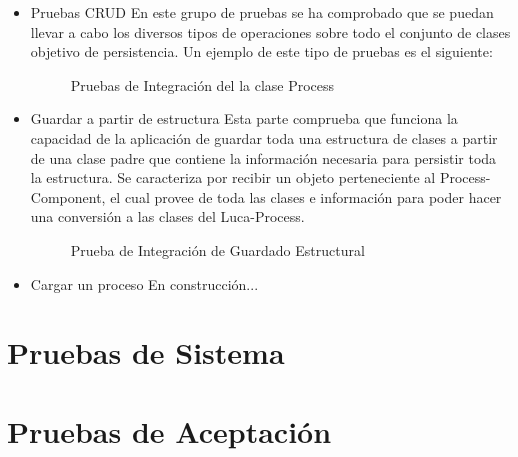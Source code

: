 		\begin{itemize}
			\item Pruebas CRUD
			\subitem En este grupo de pruebas se ha comprobado que se puedan llevar a cabo los diversos tipos de operaciones sobre todo el conjunto de clases objetivo de persistencia. Un ejemplo de este tipo de pruebas es el siguiente: 
			
			\begin{figure}[H]
				\centering
				\caption{Pruebas de Integración del la clase Process}\label{fig:pruebasIntegracionSimples}
			\end{figure}
			
			\item Guardar a partir de estructura
			\subitem Esta parte comprueba que funciona la capacidad de la aplicación de guardar toda una estructura de clases a partir de una clase padre que contiene la información necesaria para persistir toda la estructura. Se caracteriza por recibir un objeto perteneciente al Process-Component, el cual provee de toda las clases e información para poder hacer una conversión a las clases del Luca-Process.
			
			
			\begin{figure}[H]
				\centering
				\caption{Prueba de Integración de Guardado Estructural}\label{fig:pruebasIntegracionComplejas}
			\end{figure}
		
			\item Cargar un proceso
			\subitem En construcción...
			
		\end{itemize}
				
		\section{Pruebas de Sistema}
		
		\section{Pruebas de Aceptación}
	
	
